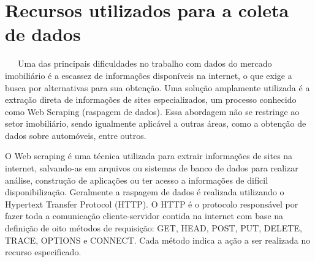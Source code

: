 \documentclass[
  12pt,
  a4paper,
]{scrreprt}
\begin{document}
\section{Recursos utilizados para a coleta de
dados}\label{recursos-utilizados-para-a-coleta-de-dados}

~~~Uma das principais dificuldades no trabalho com dados do mercado
imobiliário é a escassez de informações disponíveis na internet, o que
exige a busca por alternativas para sua obtenção. Uma solução amplamente
utilizada é a extração direta de informações de sites especializados, um
processo conhecido como Web Scraping (raspagem de dados). Essa abordagem
não se restringe ao setor imobiliário, sendo igualmente aplicável a
outras áreas, como a obtenção de dados sobre automóveis, entre outros.

\vspace{12pt}

O Web scraping é uma técnica utilizada para extrair informações de sites
na internet, salvando-as em arquivos ou sistemas de banco de dados para
realizar análise, construção de aplicações ou ter acesso a informações
de difícil disponibilização. Geralmente a raspagem de dados é realizada
utilizando o Hypertext Transfer Protocol (HTTP). O HTTP é o protocolo
responsável por fazer toda a comunicação cliente-servidor contida na
internet com base na definição de oito métodos de requisição: GET, HEAD,
POST, PUT, DELETE, TRACE, OPTIONS e CONNECT. Cada método indica a ação a
ser realizada no recurso especificado.
\end{document}
